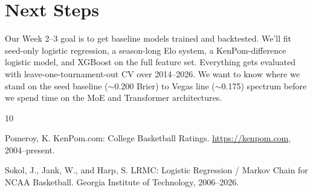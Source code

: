\documentclass[11pt,a4paper]{article}
\begin{document}
\section{Next Steps}

Our Week 2--3 goal is to get baseline models trained and backtested. We'll fit seed-only logistic regression, a season-long Elo system, a KenPom-difference logistic model, and XGBoost on the full feature set. Everything gets evaluated with leave-one-tournament-out CV over 2014--2026. We want to know where we stand on the seed baseline ($\sim$0.200 Brier) to Vegas line ($\sim$0.175) spectrum before we spend time on the MoE and Transformer architectures.




\begin{thebibliography}{10}

Pomeroy, K.
\newblock KenPom.com: College Basketball Ratings.
\newblock \url{https://kenpom.com}, 2004--present.

Sokol, J., Jank, W., and Harp, S.
\newblock LRMC: Logistic Regression / Markov Chain for NCAA Basketball.
\newblock Georgia Institute of Technology, 2006--2026.

\end{thebibliography}
\end{document}

